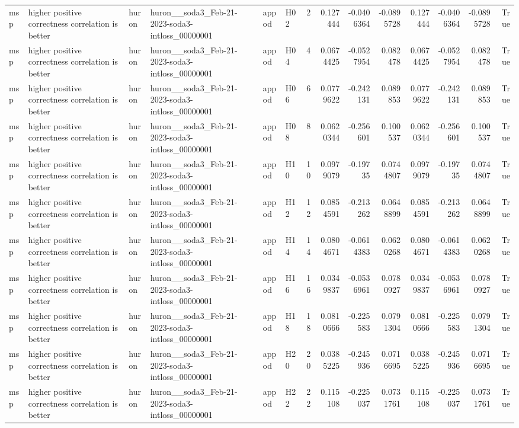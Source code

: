 \begin{longtable}{llllllrrrrrrrr}
msp & higher positive correctness correlation is better & huron & huron\_\_soda3\_Feb-21-2023-soda3-intloss\_00000001 & appod & H02 & 2 & 0.127444 & -0.0406364 & -0.0895728 & 0.127444 & -0.0406364 & -0.0895728 & True \\
msp & higher positive correctness correlation is better & huron & huron\_\_soda3\_Feb-21-2023-soda3-intloss\_00000001 & appod & H04 & 4 & 0.0674425 & -0.0527954 & 0.082478 & 0.0674425 & -0.0527954 & 0.082478 & True \\
msp & higher positive correctness correlation is better & huron & huron\_\_soda3\_Feb-21-2023-soda3-intloss\_00000001 & appod & H06 & 6 & 0.0779622 & -0.242131 & 0.089853 & 0.0779622 & -0.242131 & 0.089853 & True \\
msp & higher positive correctness correlation is better & huron & huron\_\_soda3\_Feb-21-2023-soda3-intloss\_00000001 & appod & H08 & 8 & 0.0620344 & -0.256601 & 0.100537 & 0.0620344 & -0.256601 & 0.100537 & True \\
msp & higher positive correctness correlation is better & huron & huron\_\_soda3\_Feb-21-2023-soda3-intloss\_00000001 & appod & H10 & 10 & 0.0979079 & -0.19735 & 0.0744807 & 0.0979079 & -0.19735 & 0.0744807 & True \\
msp & higher positive correctness correlation is better & huron & huron\_\_soda3\_Feb-21-2023-soda3-intloss\_00000001 & appod & H12 & 12 & 0.0854591 & -0.213262 & 0.0648899 & 0.0854591 & -0.213262 & 0.0648899 & True \\
msp & higher positive correctness correlation is better & huron & huron\_\_soda3\_Feb-21-2023-soda3-intloss\_00000001 & appod & H14 & 14 & 0.0804671 & -0.0614383 & 0.0620268 & 0.0804671 & -0.0614383 & 0.0620268 & True \\
msp & higher positive correctness correlation is better & huron & huron\_\_soda3\_Feb-21-2023-soda3-intloss\_00000001 & appod & H16 & 16 & 0.0349837 & -0.0536961 & 0.0780927 & 0.0349837 & -0.0536961 & 0.0780927 & True \\
msp & higher positive correctness correlation is better & huron & huron\_\_soda3\_Feb-21-2023-soda3-intloss\_00000001 & appod & H18 & 18 & 0.0810666 & -0.225583 & 0.0791304 & 0.0810666 & -0.225583 & 0.0791304 & True \\
msp & higher positive correctness correlation is better & huron & huron\_\_soda3\_Feb-21-2023-soda3-intloss\_00000001 & appod & H20 & 20 & 0.0385225 & -0.245936 & 0.0716695 & 0.0385225 & -0.245936 & 0.0716695 & True \\
msp & higher positive correctness correlation is better & huron & huron\_\_soda3\_Feb-21-2023-soda3-intloss\_00000001 & appod & H22 & 22 & 0.115108 & -0.225037 & 0.0731761 & 0.115108 & -0.225037 & 0.0731761 & True \\

\end{longtable}
